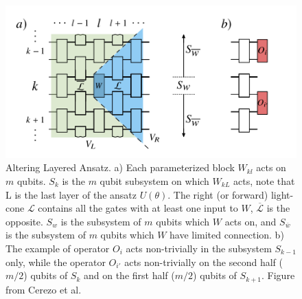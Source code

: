 \begin{figure}
    \centering
    \includegraphics[scale=0.5]{LiteratureReview/Appendices/alterlayeransatz.png}
    \caption{
        Altering Layered Ansatz. 
        a) Each parameterized block $W_{kl}$ acts on $m$ qubits.
        $S_k$ is the $m$ qubit subsystem on which $W_{kL}$ acts, note that L is the last layer of the ansatz $U(\theta)$.
        The right (or forward) light-cone $\mathcal{L}$ contains all the gates with at least one input to $W$, $\overline{\mathcal{L}}$ is the opposite.
        $S_w$ is the subsystem of $m$ qubits which $W$ acts on, and $S_{\overline{w}}$ is the subsystem of $m$ qubits which $W$ have limited connection.
        b) The example of operator $O_i$ acts non-trivially in the subsystem $S_{k-1}$ only, while the operator $O_{i'}$ acts non-trivially on the second half ($m/2$) qubits of $S_k$ and on the first half ($m/2$) qubits of $S_{k+1}$.
        Figure from Cerezo et al. \cite{cerezoCostFunctionDependent2021}
    }
    \label{Altering Layered Ansatz}
\end{figure}

